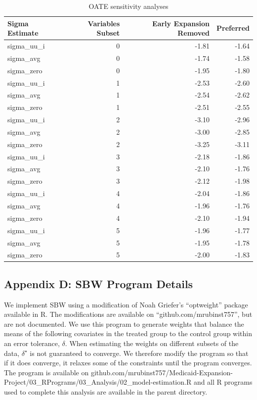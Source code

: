 \documentclass[12pt]{article}
\begin{document}
\begin{table}[ht]
\centering
\begin{tabular}{lrrr}
  \hline
Sigma Estimate & Variables Subset & Early Expansion Removed & Preferred \\ 
  \hline
sigma\_uu\_i & 0 & -1.81 & -1.64 \\ 
  sigma\_avg & 0 & -1.74 & -1.58 \\ 
  sigma\_zero & 0 & -1.95 & -1.80 \\ 
  sigma\_uu\_i & 1 & -2.53 & -2.60 \\ 
  sigma\_avg & 1 & -2.54 & -2.62 \\ 
  sigma\_zero & 1 & -2.51 & -2.55 \\ 
  sigma\_uu\_i & 2 & -3.10 & -2.96 \\ 
  sigma\_avg & 2 & -3.00 & -2.85 \\ 
  sigma\_zero & 2 & -3.25 & -3.11 \\ 
  sigma\_uu\_i & 3 & -2.18 & -1.86 \\ 
  sigma\_avg & 3 & -2.10 & -1.76 \\ 
  sigma\_zero & 3 & -2.12 & -1.98 \\ 
  sigma\_uu\_i & 4 & -2.04 & -1.86 \\ 
  sigma\_avg & 4 & -1.96 & -1.76 \\ 
  sigma\_zero & 4 & -2.10 & -1.94 \\ 
  sigma\_uu\_i & 5 & -1.96 & -1.77 \\ 
  sigma\_avg & 5 & -1.95 & -1.78 \\ 
  sigma\_zero & 5 & -2.00 & -1.83 \\ 
   \hline
\end{tabular}
\caption{OATE sensitivity analyses}
\label{oatesensitive}
\end{table}


\subsection{Appendix D: SBW Program Details}

We implement SBW using a modification of Noah Griefer's ``optweight'' package available in R. The modifications are available on ``github.com/mrubinst757'', but are not documented. We use this program to generate weights that balance the means of the following covariates in the treated group to the control group within an error tolerance, $\delta$. When estimating the weights on different subsets of the data, $\delta^\star$ is not guaranteed to converge. We therefore modify the program so that if it does converge, it relaxes some of the constraints until the program converges. The program is available on github.com/mrubinst757/Medicaid-Expansion-Project/03\_RPrograms/03\_Analysis/02\_model-estimation.R and all R programs used to complete this analysis are available in the parent directory.
\end{document}
